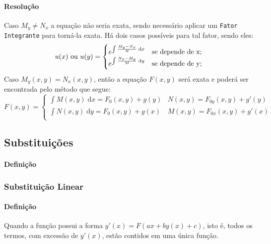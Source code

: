 \documentclass{article}
\begin{document}
                \paragraph{Resolução}Caso $M_{y}\neq N_{x}$ a equação não seria exata, sendo necessário aplicar um \texttt{Fator Integrante} para torná-la exata. Há dois casos possíveis para tal fator, sendo eles:
                    \begin{equation*}
                        u(x) \text{ ou } u(y) =
                        \begin{cases}
                            e^{\int{\frac{M_{y}-N_{x}}{N}\;\text{d}x}} & \text{se depende de } $x$;\\

                            e^{\int{\frac{N_{x}-M_{y}}{M}\;\text{d}y}} & \text{se depende de } $y$;\\
                        \end{cases}
                    \end{equation*}
                Caso $M_{y}(x,y) = N_{x}(x,y)$, então a equação $F(x,y)$ será exata e poderá ser encontrada pelo método que segue:
                    \begin{equation}
                        F(x,y) = 
                        \begin{cases}
                            \int M(x,y)\;\text{d}x = F_{0}(x,y) + g(y)&
                            N(x,y) = F_{0y}(x,y)+g'(y)\\

                            \int N(x,y)\;\text{d}y = F_{0}(x,y) + g(x)&
                            M(x,y) = F_{0x}(x,y)+g'(x)\\
                        \end{cases}
                    \end{equation}

        \subsection{Substituições}
            \paragraph{Definição}

            \subsubsection{Substituição Linear}
                \paragraph{Definição}Quando a função possui a forma $y'(x)=F(ax+by(x)+c)$, isto é, todos os termos, com excessão de $y'(x)$, estão contidos em uma única função.
\end{document}
